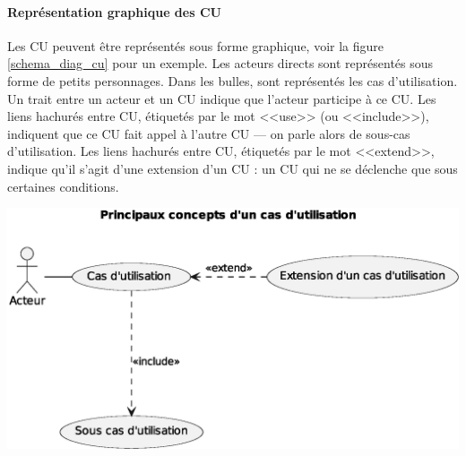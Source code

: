 \paragraph{Représentation graphique des CU}
Les CU peuvent être représentés sous forme graphique, voir la figure \ref{schema_diag_cu} pour un exemple. Les acteurs directs sont représentés sous forme de petits personnages. Dans les bulles, sont représentés les cas d'utilisation. Un trait entre un acteur et un CU indique que l'acteur participe à ce CU. Les liens hachurés entre CU, étiquetés par le mot <<use>> (ou <<include>>), indiquent que ce CU fait appel à l'autre CU --- on parle alors de sous-cas d'utilisation. Les liens hachurés entre CU, étiquetés par le mot <<extend>>, indique qu'il s'agit d'une extension d'un CU : un CU qui ne se déclenche que sous certaines conditions.

\begin{minipage}{1\linewidth} 
    \centering
    \includegraphics[width=14cm]{../schemas/exemple_diag_cu}
    \captionsetup{justification=centering}
    \label{schema_diag_cu}
\end{minipage}

